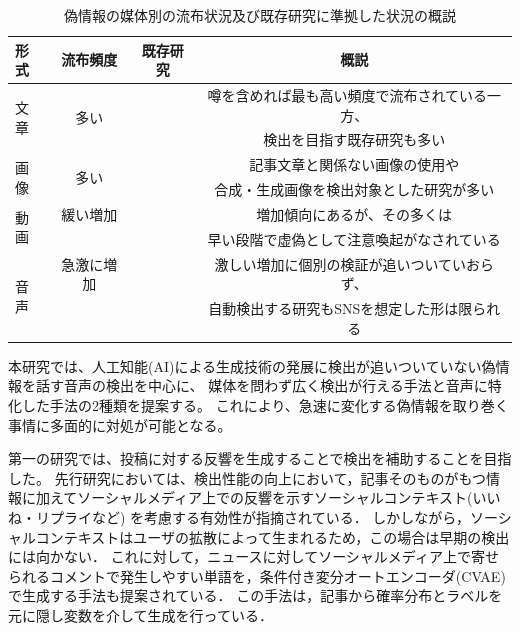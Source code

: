 \begin{table}[p]
    \centering
    \caption{偽情報の媒体別の流布状況及び既存研究に準拠した状況の概説}
    \begin{tabular}{l|c|c|c} \hline
       形式 & 流布頻度 & 既存研究 & 概説\\ \hline\hline
       \multirow{2}{*}{文章} & \multirow{2}{*}{多い} & \multirow{2}{*}{\cite{yanagi2021classifying,10.1145/3292500.3330935}} & 噂を含めれば最も高い頻度で流布されている一方、\\
       & & & 検出を目指す既存研究も多い \\\hline
       \multirow{2}{*}{画像} & \multirow{2}{*}{多い} & \multirow{2}{*}{\cite{Wang:2018:EEA:3219819.3219903,8919302}} & 記事文章と関係ない画像の使用や\\
       & & & 合成・生成画像を検出対象とした研究が多い \\\hline
       \multirow{2}{*}{動画} & 緩い増加 & \multirow{2}{*}{\cite{8683164,8668407}} & 増加傾向にあるが、その多くは\\
       & \cite{Ulmer_Tong_2023} & & 早い段階で虚偽として注意喚起がなされている \\\hline
       \multirow{2}{*}{音声} & 急激に増加 & \multirow{2}{*}{\cite{yamagishi21_asvspoof}} & %
       激しい増加に個別の検証が追いついていおらず、\\
       & \cite{cox_2023,Ulmer_Tong_2023} & & 自動検出する研究もSNSを想定した形は限られる \\ \hline
    \end{tabular}
    \label{tab:modality}
\end{table}

本研究では、人工知能(AI)による生成技術の発展に検出が追いついていない偽情報を話す音声の検出を中心に、
媒体を問わず広く検出が行える手法と音声に特化した手法の2種類を提案する。
これにより、急速に変化する偽情報を取り巻く事情に多面的に対処が可能となる。

第一の研究では、投稿に対する反響を生成することで検出を補助することを目指した。
先行研究においては、検出性能の向上において，記事そのものがもつ情報に加えてソーシャルメディア上での反響を示すソーシャルコンテキスト(いいね・リプライなど)
を考慮する有効性が指摘されている\cite{Guo:2018:RDH:3269206.3271709}．
しかしながら，ソーシャルコンテキストはユーザの拡散によって生まれるため，この場合は早期の検出には向かない．
これに対して，ニュースに対してソーシャルメディア上で寄せられるコメントで発生しやすい単語を，条件付き変分オートエンコーダ(CVAE)で生成する手法も提案されている\cite{ijcai2018-533}．
この手法は，記事から確率分布とラベルを元に隠し変数を介して生成を行っている．

